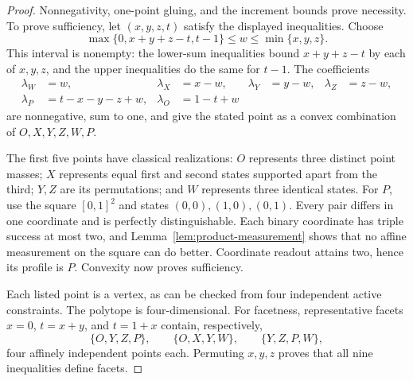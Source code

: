 \documentclass[10pt,a4paper]{amsart}
\newcommand{\1}{\mathbf 1}
\begin{document}
\begin{proof}
Nonnegativity, one-point gluing, and the increment bounds prove necessity.
To prove sufficiency, let $(x,y,z,t)$ satisfy the displayed inequalities.
Choose
\[
 \max\{0,x+y+z-t,t-1\}\le w\le\min\{x,y,z\}.
\]
This interval is nonempty: the lower-sum inequalities bound $x+y+z-t$ by each
of $x,y,z$, and the upper inequalities do the same for $t-1$. The coefficients
\begin{align*}
 \lambda_W&=w,&\lambda_X&=x-w,&\lambda_Y&=y-w,&\lambda_Z&=z-w,\\
 \lambda_P&=t-x-y-z+w,&\lambda_O&=1-t+w
\end{align*}
are nonnegative, sum to one, and give the stated point as a convex combination
of $O,X,Y,Z,W,P$.

The first five points have classical realizations: $O$ represents three
distinct point masses; $X$ represents equal first and second states supported
apart from the third; $Y,Z$ are its permutations; and $W$ represents three
identical states. For $P$, use the square $[0,1]^2$ and states
$(0,0),(1,0),(0,1)$. Every pair differs in one coordinate and is perfectly
distinguishable. Each binary coordinate has triple success at most two, and
Lemma~\ref{lem:product-measurement} shows that no affine measurement on the
square can do better. Coordinate readout attains two, hence its profile is $P$.
Convexity now proves sufficiency.

Each listed point is a vertex, as can be checked from four independent active
constraints. The polytope is four-dimensional. For facetness, representative
facets $x=0$, $t=x+y$, and $t=1+x$ contain, respectively,
\[
 \{O,Y,Z,P\},\qquad\{O,X,Y,W\},\qquad\{Y,Z,P,W\},
\]
four affinely independent points each. Permuting $x,y,z$ proves that all nine
inequalities define facets.
\end{proof}
\end{document}
